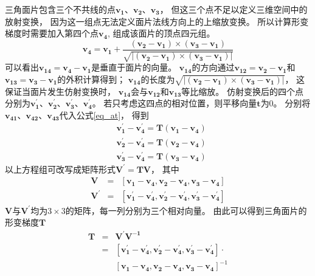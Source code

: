 三角面片包含三个不共线的点$\bm{v_1}$、$\bm{v_2}$、$\bm{v_3}$，
但这三个点不足以定义三维空间中的放射变换，
因为这一组点无法定义面片法线方向上的上缩放变换。
所以计算形变梯度时需要加入第四个点$\bm{v_4}$,
组成该面片的顶点四元组。
\begin{equation}
    \bm{v_4}=\bm{v_1}
    +
    \frac
        {(\bm{v_2}-\bm{v_1})\times(\bm{v_3}-\bm{v_1})}
        {\sqrt{|(\bm{v_2}-\bm{v_1})\times(\bm{v_3}-\bm{v_1})|}}
\end{equation}
可以看出$\bm{v_{14}}=\bm{v_4}-\bm{v_1}$是垂直于面片的向量。
$\bm{v_{14}}$的方向通过$\bm{v_{12}}=\bm{v_2}-\bm{v_1}$和
$\bm{v_{13}}=\bm{v_3}-\bm{v_1}$的外积计算得到；
$\bm{v_{14}}$的长度为$\sqrt{|(\bm{v_2}-\bm{v_1})\times(\bm{v_3}-\bm{v_1})|}$，
这保证当面片发生仿射变换时，
$\bm{v_{14}}$会与$\bm{v_{12}}$和$\bm{v_{13}}$等比缩放。
仿射变换后的四个点分别为$\bm{v_1^{'}}$、$\bm{v_2^{'}}$、$\bm{v_3^{'}}$、$\bm{v_4^{'}}$。
若只考虑这四点的相对位置，则平移向量$\bm{t}$为0。
分别将$\bm{v_{41}}$、$\bm{v_{42}}$、$\bm{v_{43}}$代入公式\ref{eq_at}，
得到
\begin{equation}
    \begin{aligned}
        &\bm{v_1^{'}}-\bm{v_4^{'}}=\bm{T}(\bm{v_1}-\bm{v_4})\\
        &\bm{v_2^{'}}-\bm{v_4^{'}}=\bm{T}(\bm{v_2}-\bm{v_4})\\
        &\bm{v_3^{'}}-\bm{v_4^{'}}=\bm{T}(\bm{v_3}-\bm{v_4})
    \end{aligned}
\end{equation}
以上方程组可改写成矩阵形式$\bm{V^{'}}=\bm{T}\bm{V}$，
其中
\begin{eqnarray}
     \bm{V}    &=&[\bm{v_1}-\bm{v_4},\bm{v_2}-\bm{v_4},\bm{v_3}-\bm{v_4}] \nonumber \\
     \bm{V^{'}}&=&[\bm{v_1^{'}}-\bm{v_4^{'}},\bm{v_2^{'}}-\bm{v_4^{'}},\bm{v_3^{'}}-\bm{v_4^{'}}]
\end{eqnarray}
$\bm{V}$与$\bm{V^{'}}$均为$3 \times 3$的矩阵，每一列分别为三个相对向量。
由此可以得到三角面片的形变梯度$\bm{T}$
\begin{eqnarray}
    \label{eq_def_grad}
    \bm{T}
    &= &\bm{V^{'}}\bm{V^{-1}} \nonumber \\
    &= &[\bm{v_1^{'}}-\bm{v_4^{'}},\bm{v_2^{'}}-\bm{v_4^{'}},\bm{v_3^{'}}-\bm{v_4^{'}}]\cdot \nonumber \\
    &\ &[\bm{v_1}-\bm{v_4},\bm{v_2}-\bm{v_4},\bm{v_3}-\bm{v_4}]^{-1}
\end{eqnarray}
